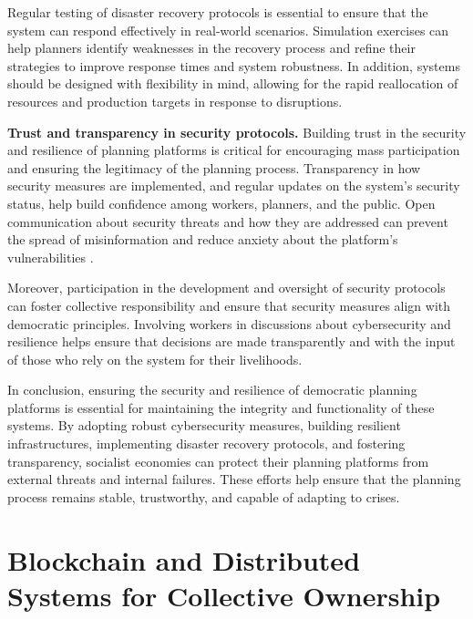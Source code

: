 \begin{refsection}
Regular testing of disaster recovery protocols is essential to ensure that the system can respond effectively in real-world scenarios. Simulation exercises can help planners identify weaknesses in the recovery process and refine their strategies to improve response times and system robustness. In addition, systems should be designed with flexibility in mind, allowing for the rapid reallocation of resources and production targets in response to disruptions.

\textbf{Trust and transparency in security protocols.} Building trust in the security and resilience of planning platforms is critical for encouraging mass participation and ensuring the legitimacy of the planning process. Transparency in how security measures are implemented, and regular updates on the system’s security status, help build confidence among workers, planners, and the public. Open communication about security threats and how they are addressed can prevent the spread of misinformation and reduce anxiety about the platform's vulnerabilities \cite[pp.~203]{devine2020democracy}.

Moreover, participation in the development and oversight of security protocols can foster collective responsibility and ensure that security measures align with democratic principles. Involving workers in discussions about cybersecurity and resilience helps ensure that decisions are made transparently and with the input of those who rely on the system for their livelihoods.

\medskip

In conclusion, ensuring the security and resilience of democratic planning platforms is essential for maintaining the integrity and functionality of these systems. By adopting robust cybersecurity measures, building resilient infrastructures, implementing disaster recovery protocols, and fostering transparency, socialist economies can protect their planning platforms from external threats and internal failures. These efforts help ensure that the planning process remains stable, trustworthy, and capable of adapting to crises.

\section{Blockchain and Distributed Systems for Collective Ownership}


\end{refsection}
